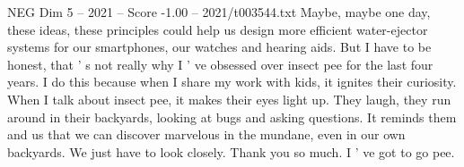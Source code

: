 \begin{textsample}{NEG Dim 5 – 2021 – Score -1.00 – 2021/t003544.txt}
Maybe, maybe one day, these ideas, these principles could help us design more efficient water-ejector systems for our smartphones, our watches and hearing aids.
But I have to be honest, that ' s not really why I ' ve obsessed over insect pee for the last four years.
I do this because when I share my work with kids, it ignites their curiosity.
When I talk about insect pee, it makes their eyes light up.
They laugh, they run around in their backyards, looking at bugs and asking questions.
It reminds them and us that we can discover marvelous in the mundane, even in our own backyards.
We just have to look closely.
Thank you so much.
I ' ve got to go pee.

\end{textsample}
